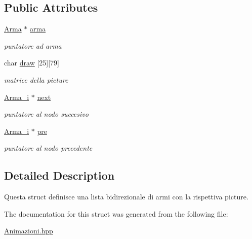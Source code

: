 \subsection*{Public Attributes}
\begin{DoxyCompactItemize}
\item 
\hypertarget{structArma__i_a31995f30ab4fa1c15bf90dd36f005e65}{}\hyperlink{classArma}{Arma} $\ast$ \hyperlink{structArma__i_a31995f30ab4fa1c15bf90dd36f005e65}{arma}\label{structArma__i_a31995f30ab4fa1c15bf90dd36f005e65}

\begin{DoxyCompactList}\small\item\em puntatore ad arma \end{DoxyCompactList}\item 
\hypertarget{structArma__i_a5c7efd2cb17b565aabc418d81ce38041}{}char \hyperlink{structArma__i_a5c7efd2cb17b565aabc418d81ce38041}{draw} \mbox{[}25\mbox{]}\mbox{[}79\mbox{]}\label{structArma__i_a5c7efd2cb17b565aabc418d81ce38041}

\begin{DoxyCompactList}\small\item\em matrice della picture \end{DoxyCompactList}\item 
\hypertarget{structArma__i_aa998dac5a34bbb1afb58fcc3c7c196ab}{}\hyperlink{structArma__i}{Arma\+\_\+i} $\ast$ \hyperlink{structArma__i_aa998dac5a34bbb1afb58fcc3c7c196ab}{next}\label{structArma__i_aa998dac5a34bbb1afb58fcc3c7c196ab}

\begin{DoxyCompactList}\small\item\em puntatore al nodo succesivo \end{DoxyCompactList}\item 
\hypertarget{structArma__i_ac43ce4b132cbb5f75ec895ea1806d0ee}{}\hyperlink{structArma__i}{Arma\+\_\+i} $\ast$ \hyperlink{structArma__i_ac43ce4b132cbb5f75ec895ea1806d0ee}{pre}\label{structArma__i_ac43ce4b132cbb5f75ec895ea1806d0ee}

\begin{DoxyCompactList}\small\item\em puntatore al nodo precedente \end{DoxyCompactList}\end{DoxyCompactItemize}


\subsection{Detailed Description}
Questa struct definisce una lista bidirezionale di armi con la rispettiva picture. 

The documentation for this struct was generated from the following file\+:\begin{DoxyCompactItemize}
\item 
\hyperlink{Animazioni_8hpp}{Animazioni.\+hpp}\end{DoxyCompactItemize}
